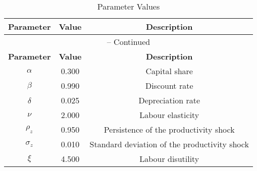 \begin{center}
\begin{longtable}{ccc}
\caption{Parameter Values}\\%
\toprule%
\multicolumn{1}{c}{\textbf{Parameter}} &
\multicolumn{1}{c}{\textbf{Value}} &
 \multicolumn{1}{c}{\textbf{Description}}\\%
\midrule%
\endfirsthead
\multicolumn{3}{c}{{\tablename} \thetable{} -- Continued}\\%
\midrule%
\multicolumn{1}{c}{\textbf{Parameter}} &
\multicolumn{1}{c}{\textbf{Value}} &
  \multicolumn{1}{c}{\textbf{Description}}\\%
\midrule%
\endhead
$\alpha$ 	 & 	 0.300 	 & 	 Capital share\\
$\beta$ 	 & 	 0.990 	 & 	 Discount rate\\
$\delta$ 	 & 	 0.025 	 & 	 Depreciation rate\\
$\nu$ 	 & 	 2.000 	 & 	 Labour elasticity\\
$\rho_z$ 	 & 	 0.950 	 & 	 Persistence of the productivity shock\\
$\sigma_z$ 	 & 	 0.010 	 & 	 Standard deviation of the productivity shock\\
$\xi$ 	 & 	 4.500 	 & 	 Labour disutility\\
\bottomrule%
\end{longtable}
\end{center}
